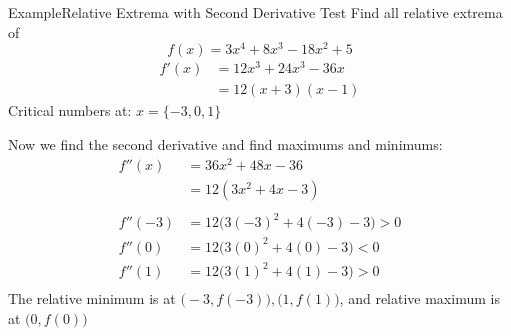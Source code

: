 \documentclass{MathNotes}
\newenvironment{example}[1]{\begin{BlueBox}{Example}{#1}}{\end{BlueBox}}
\begin{document}
\newpage
{}
\begin{example}{Relative Extrema with Second Derivative Test}
	Find all relative extrema of $$f(x)=3x^4+8x^3-18x^2+5$$
	\begin{align*}
		f'(x) & =12x^3+24x^3-36x \\
		      & =12(x+3)(x-1)
	\end{align*}
	Critical numbers at: $x=\{-3, 0, 1\}$

	Now we find the second derivative and find maximums and minimums:
	\begin{align*}
		f''(x)  & =36x^2+48x-36                  \\
		        & =12(3x^2+4x-3)                 \\
		\\
		f''(-3) & =12\big(3(-3)^2+4(-3)-3\big)>0 \\
		f''(0)  & =12\big(3(0)^2+4(0)-3\big)<0   \\
		f''(1)  & =12\big(3(1)^2+4(1)-3\big)>0   \\
	\end{align*}
	The relative minimum is at $\big(-3, f(-3)\big), \big(1, f(1)\big)$,
	and relative maximum is at $\big(0, f(0)\big)$
\end{example}
\end{document}
